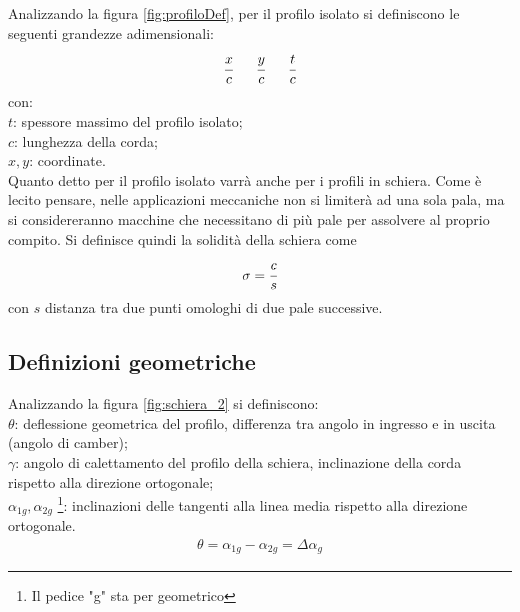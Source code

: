 Analizzando la figura \ref{fig:profiloDef}, per il profilo isolato si definiscono le seguenti grandezze adimensionali:
\begin{align*}
\cfrac{x}{c} \;\;\;\;\;\; \cfrac{y}{c} \;\;\;\;\;\; \cfrac{t}{c}
\end{align*}
con:\\[1mm]
$t$: spessore massimo del profilo isolato;\\
$c$: lunghezza della corda;\\
$x,y$: coordinate.\\[2mm]
Quanto detto per il profilo isolato varrà anche per i profili in schiera. Come è lecito pensare, nelle applicazioni meccaniche non si limiterà ad una sola pala, ma si considereranno macchine che necessitano di più pale per assolvere al proprio compito. Si definisce quindi la solidità della schiera come
\begin{equation}
\sigma = \cfrac{c}{s}
\end{equation}
con $s$ distanza tra due punti omologhi di due pale successive.
\subsection{Definizioni geometriche}
Analizzando la figura \ref{fig:schiera_2} si definiscono:\\[1mm]
$\theta$: deflessione geometrica del profilo, differenza tra angolo in ingresso e in uscita (angolo di camber);\\
$\gamma$: angolo di calettamento del profilo della schiera, inclinazione della corda rispetto alla direzione ortogonale;\\
$\alpha_{1g}, \alpha_{2g}$ \footnote{Il pedice "g" sta per geometrico}: inclinazioni delle tangenti alla linea media rispetto alla direzione ortogonale.
\begin{align*}
\theta = \alpha_{1g} - \alpha_{2g} = \Delta \alpha_{g}
\end{align*}
